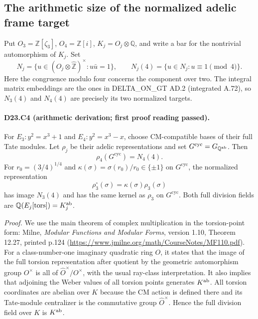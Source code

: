 
\subsection{The arithmetic size of the normalized adelic frame target}

Put $O_3=\mathbb Z[\zeta_3]$, $O_4=\mathbb Z[i]$,
$K_j=O_j\otimes\mathbb Q$, and write a bar for the nontrivial
automorphism of $K_j$.  Set
\[
 N_j=\{u\in(O_j\otimes\widehat{\mathbb Z})^\times:u\bar u=1\},
 \qquad N_j(4)=\{u\in N_j:u\equiv1\pmod4\}.
\]
Here the congruence modulo four concerns the component over two.
The integral matrix embeddings are the ones in DELTA\_ON\_GT
AD.2 (integrated A.72), so $N_3(4)$ and $N_4(4)$ are precisely
its two normalized targets.

\paragraph{D23.C4 (arithmetic derivation; first proof reading passed).}
For $E_3:y^2=x^3+1$ and $E_4:y^2=x^3-x$, choose CM-compatible
bases of their full Tate modules.  Let $\rho_j$ be their adelic
representations and set $G^{\mathrm{cyc}}=G_{\mathbb Q^{\rm ab}}$.
Then
\[
 \rho_4(G^{\mathrm{cyc}})=N_4(4).
\]
For $r_0=(3/4)^{1/4}$ and
$\kappa(\sigma)=\sigma(r_0)/r_0\in\{\pm1\}$ on
$G^{\mathrm{cyc}}$, the normalized representation
\[
 \rho_3^\circ(\sigma)=\kappa(\sigma)\rho_3(\sigma)
\]
has image $N_3(4)$ and has the same kernel as $\rho_3$ on
$G^{\mathrm{cyc}}$.  Both full division fields are
$\mathbb Q(E_j[\mathrm{tors}])=K_j^{\rm ab}$.

\emph{Proof.}
We use the main theorem of complex multiplication in the torsion-point
form: Milne, \emph{Modular Functions and Modular Forms}, version 1.10,
Theorem 12.27, printed p.124
(\url{https://www.jmilne.org/math/CourseNotes/MF110.pdf}).
For a class-number-one imaginary quadratic ring $O$, it states that
the image of the full torsion representation after quotient by the
geometric automorphism group $O^\times$ is all of
$\widehat O^\times/O^\times$, with the usual ray-class interpretation.
It also implies that adjoining the Weber values of all torsion points
generates $K^{\rm ab}$.  All torsion coordinates are abelian over $K$
because the CM action is defined there and its Tate-module centralizer
is the commutative group $\widehat O^\times$.  Hence the full division
field over $K$ is $K^{\rm ab}$.

